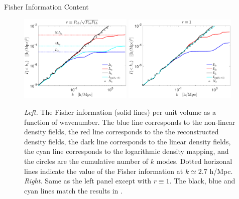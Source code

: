 \begin{section}{Fisher Information Content}
  \begin{figure}
    \includegraphics[width=0.48\textwidth]{fig4a.pdf}
    \includegraphics[width=0.48\textwidth]{fig4b.pdf}
    \centering
    \caption{{\it Left.} The Fisher information (solid lines) per unit volume as
      a function of wavenumber.  The blue line corresponds to the
      non-linear density fields, the red line corresponds
      to the the reconstructed density fields, the dark line
      corresponds to the linear density fields, the cyan line
      corresponds to the logarithmic density mapping, and the circles
      are the cumulative number of $k$ modes.  Dotted horizonal lines indicate the value of the 
      Fisher information at $k \simeq 2.7$ h/Mpc.  {\it Right.} Same
      as the left panel except with $r\equiv 1$. The black, blue and cyan lines
      match the results in \cite{bib:Rimes2006,bib:Mark2009}.}
  \label{fig:fisherinfo}
\end{figure}
\end{section}
